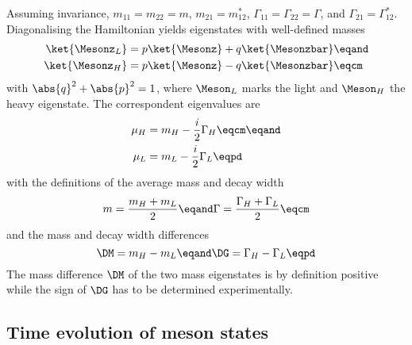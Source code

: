 Assuming \CPT invariance, $m_{11} = m_{22} = m$, $m_{21} = m_{12}^{\ast}$,
$\Gamma_{11} = \Gamma_{22} = \Gamma$, and $\Gamma_{21} = \Gamma_{12}^{\ast}$.
Diagonalising the Hamiltonian yields eigenstates with well-defined masses
%
\begin{equation}\label{eq:cpv_theory:flavour_physics:bmixing:mass_eigenstates}
  \begin{split}
    \ket{\Mesonz_L} &= p \ket{\Mesonz} + q \ket{\Mesonzbar}\eqand \\
    \ket{\Mesonz_H} &= p \ket{\Mesonz} - q \ket{\Mesonzbar}\eqcm
  \end{split}
\end{equation}
%
with $\abs{q}^2 + \abs{p}^2 = 1$, where $\Meson_L$ marks the light and
$\Meson_H$ the heavy eigenstate. The correspondent eigenvalues are
%
\begin{equation}
  \begin{split}
    \mu_H &= m_H - \frac{i}{2} \Gamma_H\eqcm\eqand \\
    \mu_L &= m_L - \frac{i}{2} \Gamma_L\eqpd
  \end{split}
\end{equation}
%
with the definitions of the average mass and decay width
%
\begin{equation}
  m = \frac{m_H + m_L}{2} \eqand \Gamma = \frac{\Gamma_H + \Gamma_L}{2}\eqcm
\end{equation}
%
and the mass and decay width differences
%
\begin{equation}
  \DM = m_H - m_L \eqand \DG = \Gamma_H - \Gamma_L\eqpd
\end{equation}
%
The mass difference $\DM$ of the two mass eigenstates is by definition positive
while the sign of $\DG$ has to be determined experimentally.
%
%


\subsection{Time evolution of meson states}
\label{sec:cpv_theory:flavour_physics:time_evolution}

